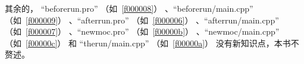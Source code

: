 其余的，
“before\underline{\hspace{0.5em}}run.pro”
（如\filesourcenumbernameone\ \ref{f000008}）
、“before\underline{\hspace{0.5em}}run/main.cpp”
（如\filesourcenumbernameone\ \ref{f000009}）
、“after\underline{\hspace{0.5em}}run.pro”
（如\filesourcenumbernameone\ \ref{f000006}）
、“after\underline{\hspace{0.5em}}run/main.cpp”
（如\filesourcenumbernameone\ \ref{f000007}）
、“new\underline{\hspace{0.5em}}moc.pro”
（如\filesourcenumbernameone\ \ref{f00000b}）
、“new\underline{\hspace{0.5em}}moc/main.cpp”
（如\filesourcenumbernameone\ \ref{f00000c}）
和
“the\underline{\hspace{0.5em}}run/main.cpp”
（如\filesourcenumbernameone\ \ref{f00000a}）
没有新知识点，本书不赘述。


